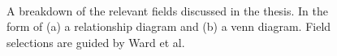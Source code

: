 \begin{figure}[t]
\centering 
{}~~~
\caption{A breakdown of the relevant fields discussed in the thesis. In the form of (a) a relationship diagram and (b) a venn diagram.  Field selections are guided by Ward et al.\ \cite{ward2010interactive}} \label{fig:breakdown}
\end{figure} 

